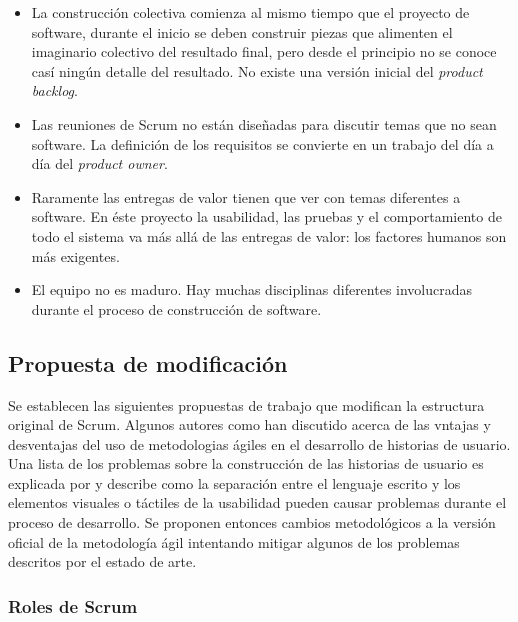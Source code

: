 \begin{itemize}

  \item La construcción colectiva comienza al mismo tiempo que el proyecto de software, durante el inicio se deben construir piezas que alimenten el imaginario colectivo del resultado final, pero desde el principio no se conoce casí ningún detalle del resultado. No existe una versión inicial del \textit{product backlog}.

  \item Las reuniones de Scrum no están diseñadas para discutir temas que no sean software. La definición de los requisitos se convierte en un trabajo del día a día del \textit{product owner}.

  \item Raramente las entregas de valor tienen que ver con temas diferentes a software. En éste proyecto la usabilidad, las pruebas y el comportamiento de todo el sistema va más allá de las entregas de valor: los factores humanos son más exigentes.

  \item El equipo no es maduro. Hay muchas disciplinas diferentes involucradas durante el proceso de construcción de software.

\end{itemize}

\subsection{Propuesta de modificación}

Se establecen las siguientes propuestas de trabajo que modifican la estructura original de Scrum. Algunos autores como \cite{peixoto2009human, moreno2012agile, nielsen2008agile} han discutido acerca de las vntajas y desventajas del uso de metodologias ágiles en el desarrollo de historias de usuario. Una lista de los problemas sobre la construcción de las historias de usuario es explicada por \cite{peixoto2009human} y describe como la separación entre el lenguaje escrito y los elementos visuales o táctiles de la usabilidad pueden causar problemas durante el proceso de desarrollo. Se proponen entonces cambios metodológicos a la versión oficial de la metodología ágil intentando mitigar algunos de los problemas descritos por el estado de arte.

\subsubsection{Roles de Scrum}

